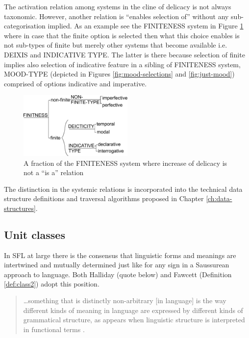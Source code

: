 The activation relation among systems in the cline of delicacy is not always taxonomic. However, another relation is ``enables selection of'' without any sub-categorisation implied. As an example see the FINITENESS system in Figure \ref{fig:finitness-fraction} where in case that the finite option is selected then what this choice enables is not sub-types of finite but merely other systems that become available i.e. DEIXIS and INDICATIVE TYPE. The latter is there because selection of finite implies also selection of indicative feature in a sibling of FINITENESS system, MOOD-TYPE (depicted in Figures \ref{fig:mood-selections} and \ref{fig:just-mood}) comprised of options indicative and imperative.

\begin{figure}[!ht]
    \centering
    \includegraphics[width=0.5\textwidth]{Figures/SFL-grammar/finitness-system.pdf}
    \caption{A fraction of the FINITENESS system where increase of delicacy is not a ``is a'' relation}
    \label{fig:finitness-fraction}
\end{figure}

The distinction in the systemic relations is incorporated into the technical data structure definitions and traversal algorithms proposed in Chapter \ref{ch:data-structures}.

\subsection{Unit classes}
\label{sec:unit-classes}

In SFL at large there is the consensus that linguistic forms and meanings are intertwined and mutually determined just like for any sign in a Saussurean approach to language. Both Halliday (quote below) and Fawcett (Definition \ref{def:class2}) adopt this position. 

\begin{quotation}
	\dots something that is distinctly non-arbitrary [in language] is the way different kinds of meaning in language are expressed by different kinds of grammatical structure, as appears when linguistic structure is interpreted in functional terms \citep{Halliday2003-Ideas-about-language}.
\end{quotation}

